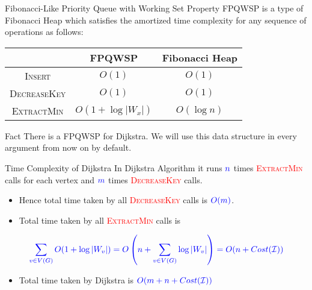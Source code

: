 \documentclass[10pt, handout]{beamer}
\begin{document}
\begin{frame}{Fibonacci-Like Priority Queue with Working Set Property}
	FPQWSP  is a type of Fibonacci Heap which satisfies the amortized time complexity for any sequence of operations as follows:\vfill \pause

	\begin{center}
		\begin{tabular}{|c|c|c|}
			\hline
			                     & FPQWSP           & Fibonacci Heap \\ \hline
			\textsc{Insert}      & $O(1)$           & $O(1)$         \\ \hline
			\textsc{DecreaseKey} & $O(1)$           & $O(1)$         \\ \hline
			\textsc{ExtractMin}  & $O(1+\log|W_x|)$ & $O(\log n)$    \\ \hline
		\end{tabular}
	\end{center}\pause
	\vfill


	\begin{alertblock}{Fact}
		There is a FPQWSP for Dijkstra. We will use this data structure in every argument from now on by default.
	\end{alertblock}
\end{frame}
\begin{frame}{Time Complexity of Dijkstra}
	In Dijkstra Algorithm it runs $\mathcolor{blue}{n}$ times \textcolor{red}{\textsc{ExtractMin}} calls for each vertex and $\mathcolor{blue}{m}$ times \textcolor{red}{\textsc{DecreaseKey}} calls.\pause
	\begin{itemize}
		\item Hence total time taken by all \textcolor{red}{\textsc{DecreaseKey}} calls is $\mathcolor{blue}{O(m)}$.\pause
		\item Total time taken by all \textcolor{red}{\textsc{ExtractMin}} calls is
	\end{itemize}
	$$
		\mathcolor{blue}{\sum\limits_{v\in V(G)}O(1+\log|W_v|)= O\left(n+\sum\limits_{v\in V(G)} \log |W_v| \right)= O(n+Cost(\mathcal{I}))}
	$$
	\begin{itemize}
		\item Total time taken by Dijkstra is $\mathcolor{blue}{O(m+n+Cost(\mathcal{I}))}$
	\end{itemize}
\end{frame}
\end{document}
